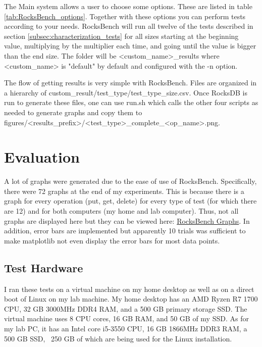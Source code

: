 \documentclass[twocolumn,11pt]{article}
\begin{document}
The Main system allows a user to choose some options. These are listed in table
\ref{tab:RocksBench_options}. Together with these options you can perform tests
according to your needs. RocksBench will run all twelve of the tests described
in section \ref{subsec:characterization_tests} for all sizes starting at the
beginning value, multiplying by the multiplier each time, and going until the
value is bigger than the end size. The folder will be <custom\_name>\_results
where <custom\_name> is "default" by default and configured with the -n option.

The flow of getting results is very simple with RocksBench. Files are organized
in a hierarchy of custom\_result/test\_type/test\_type\_size.csv. Once RocksDB
is run to generate these files, one can use run.sh which calls the other four
scripts as needed to generate graphs and copy them to
figures/<results\_prefix>/<test\_type>\_complete\_<op\_name>.png.

\section{Evaluation}

A lot of graphs were generated due to the ease of use of RocksBench.
Specifically, there were 72 graphs at the end of my experiments. This is because
there is a graph for every operation (put, get, delete) for every type of test
(for which there are 12) and for both computers (my home and lab computer).
Thus, not all graphs are displayed here but they can be viewed here:
\href{https://github.com/legendddhgf/Database_Systems_Project/tree/master/project/doc/Pictures}
{RocksBench Graphs}.
In addition, error bars are implemented but apparently 10 trials was sufficient
to make matplotlib not even display the error bars for most data points.

\subsection{Test Hardware}
\label{subsec:test_hw}

I ran these tests on a virtual machine on my home desktop as well as on a direct
boot of Linux on my lab machine. My home desktop has an AMD Ryzen R7 1700 CPU,
32 GB 3000MHz DDR4 RAM, and a 500 GB primary storage SSD. The virtual machine
uses 8 CPU cores, 16 GB RAM, and 50 GB of my SSD. As for my lab PC, it has an
Intel core i5-3550 CPU, 16 GB 1866MHz DDR3 RAM, a 500 GB SSD, ~250 GB of which
are being used for the Linux installation.
\end{document}
